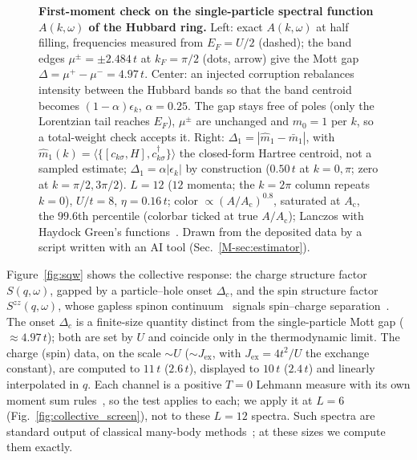 \documentclass[aps,prb,onecolumn,superscriptaddress,longbibliography,floatfix]{revtex4-2}
\begin{document}
\begin{figure}[t]
\centering
{}
\caption{\textbf{First-moment check on the single-particle spectral function $A(k,\omega)$ of the Hubbard ring.} Left: exact $A(k,\omega)$ at half filling, frequencies measured from $E_F=U/2$ (dashed); the band edges $\mu^\pm=\pm2.484\,t$ at $k_F=\pi/2$ (dots, arrow) give the Mott gap $\Delta=\mu^+-\mu^-=4.97\,t$. Center: an injected corruption rebalances intensity between the Hubbard bands so that the band centroid becomes $(1-\alpha)\epsilon_k$, $\alpha=0.25$. The gap stays free of poles (only the Lorentzian tail reaches $E_F$), $\mu^\pm$ are unchanged and $m_0=1$ per $k$, so a total-weight check accepts it. Right: $\Delta_1=|\widehat m_1-\bar m_1|$, with ${\widehat m_1(k)=\langle\{[c_{k\sigma},H],c_{k\sigma}^\dagger\}\rangle}$ the closed-form Hartree centroid, not a sampled estimate; $\Delta_1=\alpha|\epsilon_k|$ by construction ($0.50\,t$ at $k=0,\pi$; zero at $k=\pi/2,3\pi/2$). $L=12$ ($12$ momenta; the $k=2\pi$ column repeats $k=0$), $U/t=8$, $\eta=0.16\,t$; color $\propto(A/A_{\mathrm c})^{0.8}$, saturated at $A_{\mathrm c}$, the $99.6$th percentile (colorbar ticked at true $A/A_{\mathrm c}$); Lanczos with Haydock Green's functions~\cite{Haydock1972,Lanczos1950}. Drawn from the deposited data by a script written with an AI tool (Sec.~\ref{M-sec:estimator}).}
\label{fig:akw}
\end{figure}

Figure~\ref{fig:sqw} shows the collective response: the charge structure factor $S(q,\omega)$, gapped by a particle--hole onset $\Delta_c$, and the spin structure factor $S^{zz}(q,\omega)$, whose gapless spinon continuum~\cite{Voit1995} signals spin--charge separation~\cite{Benthien2004}. The onset $\Delta_c$ is a finite-size quantity distinct from the single-particle Mott gap ($\approx4.97\,t$); both are set by $U$ and coincide only in the thermodynamic limit. The charge (spin) data, on the scale $\sim U$ ($\sim J_{\mathrm{ex}}$, with $J_{\mathrm{ex}}=4t^2/U$ the exchange constant), are computed to $11\,t$ ($2.6\,t$), displayed to $10\,t$ ($2.4\,t$) and linearly interpolated in $q$. Each channel is a positive $T=0$ Lehmann measure with its own moment sum rules~\cite{HohenbergMartin1965}, so the test applies to each; we apply it at $L=6$ (Fig.~\ref{fig:collective_screen}), not to these $L=12$ spectra. Such spectra are standard output of classical many-body methods~\cite{KuhnerWhite1999,Jeckelmann2002,Schollwock2011,Georges1996,Gull2011,Jarrell1996}; at these sizes we compute them exactly.
\end{document}
